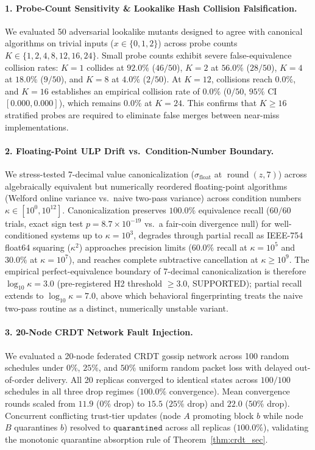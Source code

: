 \documentclass[10pt,twocolumn]{article}
\begin{document}
\paragraph{1. Probe-Count Sensitivity \& Lookalike Hash Collision Falsification.}
We evaluated 50 adversarial lookalike mutants designed to agree with canonical algorithms on trivial inputs ($x \in \{0, 1, 2\}$) across probe counts $K \in \{1, 2, 4, 8, 12, 16, 24\}$. Small probe counts exhibit severe false-equivalence collision rates: $K=1$ collides at $92.0\%$ ($46/50$), $K=2$ at $56.0\%$ ($28/50$), $K=4$ at $18.0\%$ ($9/50$), and $K=8$ at $4.0\%$ ($2/50$). At $K=12$, collisions reach $0.0\%$, and $K=16$ establishes an empirical collision rate of $0.0\%$ ($0/50$, $95\%$ CI $[0.000, 0.000]$), which remains $0.0\%$ at $K=24$. This confirms that $K \ge 16$ stratified probes are required to eliminate false merges between near-miss implementations.

\paragraph{2. Floating-Point ULP Drift vs.\ Condition-Number Boundary.}
We stress-tested 7-decimal value canonicalization ($\sigma_{\text{float}}$ at $\operatorname{round}(z, 7)$) across algebraically equivalent but numerically reordered floating-point algorithms (Welford online variance vs.\ naive two-pass variance) across condition numbers $\kappa \in [10^0, 10^{12}]$. Canonicalization preserves $100.0\%$ equivalence recall ($60/60$ trials, exact sign test $p = 8.7 \times 10^{-19}$ vs.\ a fair-coin divergence null) for well-conditioned systems up to $\kappa = 10^3$, degrades through partial recall as IEEE-754 float64 squaring ($\kappa^2$) approaches precision limits ($60.0\%$ recall at $\kappa = 10^5$ and $30.0\%$ at $\kappa = 10^7$), and reaches complete subtractive cancellation at $\kappa \ge 10^9$. The empirical perfect-equivalence boundary of 7-decimal canonicalization is therefore $\log_{10} \kappa = 3.0$ (pre-registered H2 threshold $\ge 3.0$, SUPPORTED); partial recall extends to $\log_{10} \kappa = 7.0$, above which behavioral fingerprinting treats the naive two-pass routine as a distinct, numerically unstable variant.

\paragraph{3. 20-Node CRDT Network Fault Injection.}
We evaluated a 20-node federated CRDT gossip network across 100 random schedules under $0\%$, $25\%$, and $50\%$ uniform random packet loss with delayed out-of-order delivery. All 20 replicas converged to identical states across $100/100$ schedules in all three drop regimes ($100.0\%$ convergence). Mean convergence rounds scaled from $11.9$ ($0\%$ drop) to $15.5$ ($25\%$ drop) and $22.0$ ($50\%$ drop). Concurrent conflicting trust-tier updates (node $A$ promoting block $b$ while node $B$ quarantines $b$) resolved to $\texttt{quarantined}$ across all replicas ($100.0\%$), validating the monotonic quarantine absorption rule of Theorem~\ref{thm:crdt_sec}.
\end{document}
